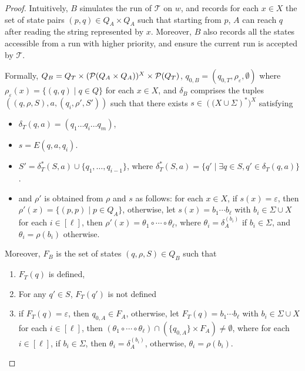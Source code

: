 \documentclass[sigplan,review,anonymous]{acmart}\settopmatter{printfolios=true,printccs=false,printacmref=false}
\newcommand\psst{\mathcal{T}}
\begin{document}
\begin{proof}
Intuitively, $B$ simulates the run of $\psst$ on $w$, and records  for each $x \in X$ the set of state pairs $(p, q) \in Q_A \times Q_A$ such that starting from $p$, $A$ can reach $q$ after reading the string represented by $x$. Moreover, $B$ also records all the states accessible from a run with higher priority, and ensure the current run is accepted by $\psst$.

Formally, $Q_B = Q_T \times (\mathcal{P}(Q_A \times Q_A ))^{X} \times \mathcal{P}(Q_T)  $, $q_{0, B} = (q_{0, T}, \rho_{\varepsilon}, \emptyset)$ where $\rho_{\varepsilon} (x) = \{(q, q) \mid q \in Q\}$ for each $x \in X$, and $\delta_{B}$ comprises the tuples $((q, \rho, S), a, (q_i, \rho', S'))$ such that there exists $s \in \left((X \cup \Sigma\right)^*)^X$ satisfying
\begin{itemize}
\item $\delta_T (q, a) = (q_1 \ldots q_i \ldots q_m)$, 
\item $s = E(q,a,q_i)$.
\item $S' = \delta_T^{\ast} (S, a) \cup \{ q_1, \ldots, q_{i - 1} \}$, where $\delta_T^{\ast}(S,a) = \{q' \mid \exists q \in S, q' \in \delta_T(q,a)\}$.
\item and $\rho'$ is obtained from $\rho$ and $s$ as follows: for each $x \in X$, if $s(x) = \varepsilon$, then $\rho'(x) = \{(p, p) \mid p \in Q_A\}$, otherwise, let $s(x) = b_1 \cdots b_\ell$ with $b_i \in \Sigma \cup X$ for each $i \in [\ell]$, then $\rho'(x) = \theta_1 \circ \cdots \circ \theta_\ell$, where $\theta_i = \delta^{(b_i)}_A$ if $b_i \in \Sigma$, and $\theta_i = \rho(b_i)$ otherwise.
%
\end{itemize}

Moreover, $F_B$ is the set of states $(q, \rho, S) \in Q_B$
such that
\begin{enumerate}
  \item $F_T (q)$ is defined,
  \item For any $q' \in S$, $F_T (q')$ is not defined
  
  \item if $F_T(q) = \varepsilon$, then $q_{0, A}  \in F_A$, otherwise, 
let $F_T(q) = b_1 \cdots b_\ell$ with $b_i \in \Sigma \cup X$ for each $i \in [\ell]$, then $(\theta_1 \circ \cdots \circ \theta_\ell) \cap (\{q_{0,A}\} \times F_A) \neq \emptyset$, where for each $i \in [\ell]$, if $b_i \in \Sigma$, then $\theta_i = \delta^{(b_i)}_A$, otherwise, $\theta_i = \rho(b_i)$.
\end{enumerate}
\end{proof}
\end{document}
